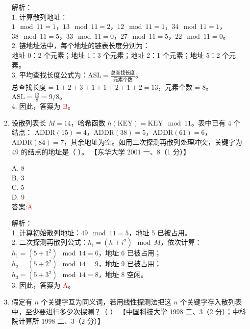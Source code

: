\documentclass[lang=cn,newtx,10pt,scheme=chinese]{../../../elegantbook}
\begin{document}
\begin{enumerate}
    解析：\\
    1. 计算散列地址：\\
       $1 \mod 11 = 1$，$13 \mod 11 = 2$，$12 \mod 11 = 1$，$34 \mod 11 = 1$，\\
       $38 \mod 11 = 5$，$33 \mod 11 = 0$，$27 \mod 11 = 5$，$22 \mod 11 = 0$。\\
    2. 链地址法中，每个地址的链表长度分别为：\\
       地址 0：2 个元素；地址 1：3 个元素；地址 2：1 个元素；地址 5：2 个元素。\\
    3. 平均查找长度公式为：$\text{ASL} = \frac{\text{总查找长度}}{\text{元素个数}}$。\\
       总查找长度 = $1 + 2 + 3 + 1 + 1 + 2 + 1 + 2 = 13$，元素个数 = 8。\\
       $\text{ASL} = \frac{13}{8} = 9/8$。\\
    4. 因此，答案为 \textcolor{red}{B}。\\

\item 设散列表长 $M = 14$，哈希函数 $h(\text{KEY}) = \text{KEY} \mod 11$。表中已有 4 个结点：  
    $\text{ADDR}(15) = 4$，$\text{ADDR}(38) = 5$，$\text{ADDR}(61) = 6$，$\text{ADDR}(84) = 7$，其余地址为空。如用二次探测再散列处理冲突，关键字为 49 的结点的地址是（ ）。  
    【东华大学 2001 一、8（1 分）】  

    A. 8 \\  
    B. 3 \\  
    C. 5 \\  
    D. 9 \\  

    答案:\textcolor{red}{A}

    解析：\\
    1. 计算初始散列地址：$49 \mod 11 = 5$，地址 5 已被占用。\\
    2. 二次探测再散列公式：$h_i = (h + i^2) \mod M$，依次计算：\\
       $h_1 = (5 + 1^2) \mod 14 = 6$，地址 6 已被占用；\\
       $h_2 = (5 + 2^2) \mod 14 = 9$，地址 9 已被占用；\\
       $h_3 = (5 + 3^2) \mod 14 = 8$，地址 8 空闲。\\
    3. 因此，答案为 \textcolor{red}{A}。\\

\item 假定有 $n$ 个关键字互为同义词，若用线性探测法把这 $n$ 个关键字存入散列表中，至少要进行多少次探测？（ ）  
    【中国科技大学 1998 二、3（2 分）；中科院计算所 1998 二、3（2 分）】  


\end{enumerate}
\end{document}
